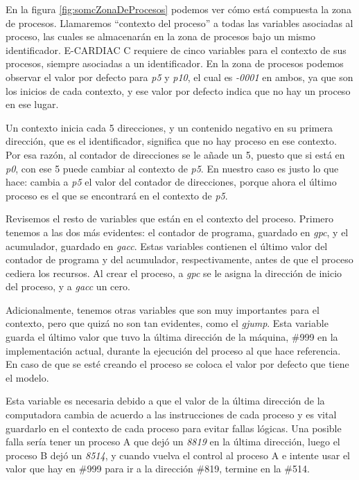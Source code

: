 \documentclass[letterpaper,12pt,oneside]{book}
\begin{document}
			En la figura \ref{fig:somcZonaDeProcesos} podemos ver cómo está compuesta la zona de procesos. Llamaremos ``contexto del proceso'' a todas
			las variables asociadas al proceso, las cuales se almacenarán en la zona de procesos bajo un mismo identificador. E-CARDIAC C requiere
			de cinco variables para el contexto de sus procesos, siempre asociadas a un identificador. En la zona de procesos podemos observar
			el valor por defecto para \textit{p5} y \textit{p10}, el cual es
			\textit{-0001} en ambos, ya que son los 
			inicios de cada contexto, y ese valor por defecto indica que no hay un proceso en ese lugar.
			
			Un contexto inicia cada 5 direcciones, y un contenido negativo en su primera dirección, que es el identificador, significa que no hay 
			proceso en ese
			contexto. Por esa razón, al contador de direcciones se le añade un 5, puesto que si está en \textit{p0}, con ese 5 puede cambiar al contexto
			de \textit{p5}. En nuestro caso es justo lo que hace: cambia a \textit{p5} el valor del contador de direcciones, porque ahora
			el último proceso es el que se encontrará en el contexto de \textit{p5}.
   
            Revisemos el resto de variables que están en el contexto del proceso. Primero tenemos a las dos más evidentes:
            el contador de programa, guardado en \textit{gpc}, y el acumulador, guardado en  \textit{gacc}. Estas variables contienen el último valor
            del contador de programa y del acumulador, respectivamente, antes de que el proceso cediera los recursos. Al crear el proceso, a 
            \textit{gpc} se le asigna la dirección de inicio del proceso, y a \textit{gacc} un cero.
            
             Adicionalmente, tenemos otras variables que 
            son muy importantes para el contexto, pero que quizá no son tan evidentes, como el \textit{gjump}. Esta variable guarda el último valor que 
            tuvo la última dirección de
			la máquina, \#999 en la implementación actual, durante la ejecución del proceso al que hace referencia. En caso de que se esté creando
			el proceso se coloca el valor por defecto que tiene el modelo. 
			
			Esta variable es necesaria debido a que el valor
			de la última dirección de la computadora cambia de acuerdo a las instrucciones de cada proceso y es vital guardarlo en
			el contexto de cada proceso para evitar fallas lógicas. Una posible falla sería tener un proceso A que dejó un \textit{8819} en la 
			última dirección, luego el proceso B dejó un \textit{8514}, y
			cuando vuelva el control al proceso A e intente usar el valor que hay en \#999 para ir a 
            la dirección \#819, termine en la \#514.
   
\end{document}
